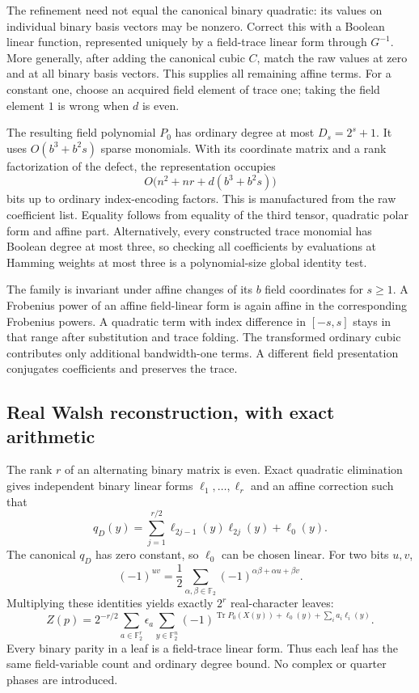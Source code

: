 \documentclass[11pt]{article}
\theoremstyle{remark}\newtheorem{remark}[theorem]{Remark}
\newcommand{\F}{\mathbb F}
\newcommand{\Tr}{\operatorname{Tr}}
\begin{document}
The refinement need not equal the canonical binary quadratic: its values on individual binary basis vectors may be nonzero. Correct this with a Boolean linear function, represented uniquely by a field-trace linear form through $G^{-1}$. More generally, after adding the canonical cubic $C$, match the raw values at zero and at all binary basis vectors. This supplies all remaining affine terms. For a constant one, choose an acquired field element of trace one; taking the field element $1$ is wrong when $d$ is even.

The resulting field polynomial $P_0$ has ordinary degree at most $D_s=2^s+1$. It uses $O(b^3+b^2s)$ sparse monomials. With its coordinate matrix and a rank factorization of the defect, the representation occupies
\[
 O\bigl(n^2+nr+d(b^3+b^2s)\bigr)
\]
bits up to ordinary index-encoding factors. This is manufactured from the raw coefficient list. Equality follows from equality of the third tensor, quadratic polar form and affine part. Alternatively, every constructed trace monomial has Boolean degree at most three, so checking all coefficients by evaluations at Hamming weights at most three is a polynomial-size global identity test.

The family is invariant under affine changes of its $b$ field coordinates for $s\ge1$. A Frobenius power of an affine field-linear form is again affine in the corresponding Frobenius powers. A quadratic term with index difference in $[-s,s]$ stays in that range after substitution and trace folding. The transformed ordinary cubic contributes only additional bandwidth-one terms. A different field presentation conjugates coefficients and preserves the trace.

\subsection{Real Walsh reconstruction, with exact arithmetic}
The rank $r$ of an alternating binary matrix is even. Exact quadratic elimination gives independent binary linear forms $\ell_1,\ldots,\ell_r$ and an affine correction such that
\[
 q_D(y)=\sum_{j=1}^{r/2}\ell_{2j-1}(y)\ell_{2j}(y)+\ell_0(y).
\]
The canonical $q_D$ has zero constant, so $\ell_0$ can be chosen linear. For two bits $u,v$,
\[
 (-1)^{uv}=\frac12\sum_{\alpha,\beta\in\F_2}
 (-1)^{\alpha\beta+\alpha u+\beta v}.
\]
Multiplying these identities yields exactly $2^r$ real-character leaves:
\begin{equation}\label{eq:walsh}
 Z(p)=2^{-r/2}\sum_{a\in\F_2^r}\epsilon_a
 \sum_{y\in\F_2^n}(-1)^{\Tr P_0(X(y))+\ell_0(y)+\sum_i a_i\ell_i(y)}.
\end{equation}
Every binary parity in a leaf is a field-trace linear form. Thus each leaf has the same field-variable count and ordinary degree bound. No complex or quarter phases are introduced.
\end{document}
